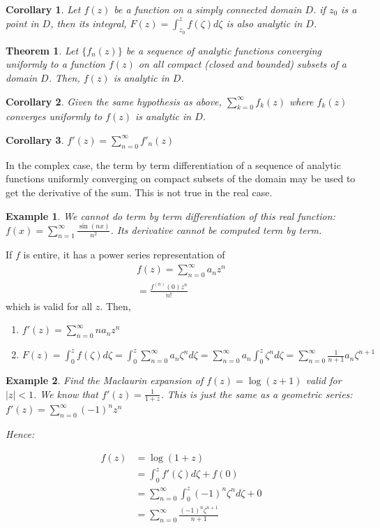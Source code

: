 \documentclass{article}
\newtheorem{theorem}{Theorem}[section]
\newtheorem{corollary}{Corollary}
\newtheorem{ex}{Example}
\theoremstyle{definition}
\begin{document}
\begin{corollary}
Let $f(z)$ be a function on a simply connected domain $D$. if $z_0$ is a point in $D$, then its integral, $F(z) = \int_{z_0}^z f(\zeta)d\zeta $ is also analytic in $D$. 
\end{corollary}
\begin{theorem}
Let $\{f_n(z)\}$ be a sequence of analytic functions converging uniformly to a function $f(z)$ on all compact (closed and bounded) subsets of a domain $D$. Then, $f(z)$ is analytic in $D$. 
\end{theorem}

\begin{corollary}
Given the same hypothesis as above, $\sum_{k=0}^\infty f_k(z)$ where $f_k(z)$ converges uniformly to $f(z)$ is analytic in $D$.
\end{corollary}

\begin{corollary}
$f'(z) = \sum_{n=0}^\infty f'_n(z)$
\end{corollary}

In the complex case, the term by term differentiation of a sequence of analytic functions uniformly converging on  compact subsets of the domain may be used to get the derivative of the sum. This is not true in the real case.

\begin{ex}
We cannot do term by term differentiation of this real function:
$f(x) = \sum_{n=1}^\infty \frac{\sin(nx)}{n^2}$. Its derivative cannot be computed term by term.
\end{ex}

If $f$ is entire, it has a power series representation of 
\begin{align}
f(z) = \sum_{n=0}^\infty a_n z^n \\ 
 = \frac{f^(n)(0) z^n}{n!}
\end{align}
which is valid for all $z$. Then, 

\begin{enumerate}
	\item $f'(z) = \sum_{n=0}^\infty n a_n z^n $
	\item $F(z) = \int_{0}^zf(\zeta)d\zeta = \int_0^z \sum_{n=0}^\infty  a_n \zeta^n d\zeta =\sum_{n=0}^\infty  a_n \int_0^z  \zeta^n d\zeta = \sum_{n=0}^\infty  \frac{1}{n+1} a_n\zeta^{n+1}  $
\end{enumerate}

\begin{ex}
Find the Maclaurin expansion of $f(z) = \log(z+1)$ valid for $|z|<1$. We know that $f'(z) = \frac{1}{1+z}$. This is just the same as a geometric series: $f'(z) = \sum_{n=0}^\infty (-1)^n z^n$

Hence:

\begin{align}
f(z) &= \log(1+z) \\ 
& = \int_{0}^z f'(\zeta) d\zeta + f(0) \\ 
& = \sum_{n=0}^\infty \int_{0}^z (-1)^n\zeta^n d\zeta + 0 \\ 
&  = \sum_{n=0}^\infty \frac{(-1)^n\zeta^{n+1}}{n+1}  
\end{align}
\end{ex}
\end{document}
